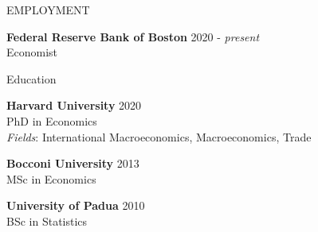 \documentclass{resume} %
\begin{document}

\begin{rSection}{EMPLOYMENT}

{\bf Federal Reserve Bank of Boston} \hfill {2020 - \textit{present}}\\
Economist

\end{rSection}

\begin{rSection}{Education}

{\bf Harvard University} \hfill {2020}
\\ 
PhD in Economics
\\
\hspace*{0.3cm} \textit{Fields}: International Macroeconomics, Macroeconomics, Trade


{\textbf{Bocconi University}}  \hfill 2013\\
MSc in Economics
 
{\textbf{University of Padua}}  \hfill 2010\\
BSc in Statistics



\end{rSection}


\end{document}
